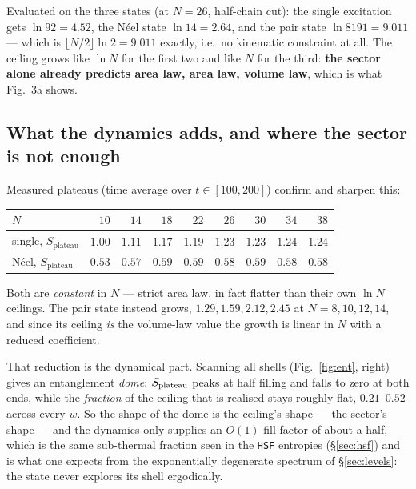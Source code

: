 \documentclass[11pt]{article}
\newcommand{\rt}[1]{\texttt{#1}}
\theoremstyle{plain}
\theoremstyle{definition}
\begin{document}
Evaluated on the three states (at $N=26$, half-chain cut): the single excitation
gets $\ln 92 = 4.52$, the N\'eel state $\ln 14 = 2.64$, and the pair state
$\ln 8191 = 9.011$ --- which is $\lfloor N/2\rfloor\ln 2 = 9.011$ exactly, i.e.\
no kinematic constraint at all. The ceiling grows like $\ln N$ for the first two
and like $N$ for the third: \textbf{the sector alone already predicts area law,
area law, volume law}, which is what Fig.~3a shows.

\subsection{What the dynamics adds, and where the sector is not enough}

Measured plateaus (time average over $t\in[100,200]$) confirm and sharpen this:
\begin{center}\footnotesize
\begin{tabular}{lrrrrrrrr}
\hline
$N$ & $10$ & $14$ & $18$ & $22$ & $26$ & $30$ & $34$ & $38$ \\
\hline
single, $S_{\mathrm{plateau}}$ & $1.00$ & $1.11$ & $1.17$ & $1.19$ & $1.23$ & $1.23$ & $1.24$ & $1.24$\\
N\'eel, $S_{\mathrm{plateau}}$ & $0.53$ & $0.57$ & $0.59$ & $0.59$ & $0.58$ & $0.59$ & $0.58$ & $0.58$\\
\hline
\end{tabular}
\end{center}
Both are \emph{constant} in $N$ --- strict area law, in fact flatter than their
own $\ln N$ ceilings. The pair state instead grows, $1.29, 1.59, 2.12, 2.45$ at
$N=8,10,12,14$, and since its ceiling \emph{is} the volume-law value the growth
is linear in $N$ with a reduced coefficient.

That reduction is the dynamical part. Scanning all shells
(Fig.~\ref{fig:ent}, right) gives an entanglement \emph{dome}: $S_{\rm plateau}$
peaks at half filling and falls to zero at both ends, while the \emph{fraction}
of the ceiling that is realised stays roughly flat, $0.21$--$0.52$ across every
$w$. So the shape of the dome is the ceiling's shape --- the sector's shape ---
and the dynamics only supplies an $O(1)$ fill factor of about a half, which is
the same sub-thermal fraction seen in the \rt{HSF} entropies (\S\ref{sec:hsf})
and is what one expects from the exponentially degenerate spectrum of
\S\ref{sec:levels}: the state never explores its shell ergodically.
\end{document}
